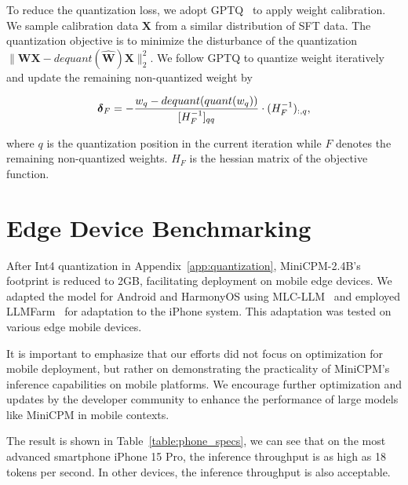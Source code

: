 \documentclass[dvipsnames]{article}
\begin{document}
To reduce the quantization loss, we adopt GPTQ~\citep{DBLP:journals/corr/abs-2210-17323} to apply weight calibration.
We sample calibration data $\mathbf{X}$ from a similar distribution of SFT data. 
The quantization objective is to minimize the disturbance of the quantization $\|\mathbf{W}\mathbf{X}-dequant(\mathbf{\hat W})\mathbf{X}\|_2^2$.
We follow GPTQ to quantize weight iteratively and update the remaining non-quantized weight by

$$
\boldsymbol{\delta}_F = - {w_q-dequant(quant(w_q)) \over [H^{-1}_F]_{qq}} \cdot (H_F^{-1})_{:,q},
$$

where $q$ is the quantization position in the current iteration while $F$ denotes the remaining non-quantized weights. $H_F$ is the hessian matrix of the objective function.

\section{Edge Device Benchmarking}

After Int4 quantization in Appendix~\ref{app:quantization}, MiniCPM-2.4B's footprint is reduced to 2GB, facilitating deployment on mobile edge devices. We adapted the model for Android and HarmonyOS using MLC-LLM~\citep{mlc-llm} and employed LLMFarm~\citep{llmfarm} for adaptation to the iPhone system. This adaptation was tested on various edge mobile devices.

It is important to emphasize that our efforts did not focus on optimization for mobile deployment, but rather on demonstrating the practicality of MiniCPM's inference capabilities on mobile platforms. We encourage further optimization and updates by the developer community to enhance the performance of large models like MiniCPM in mobile contexts. 

The result is shown in Table~\ref{table:phone_specs}, we can see that on the most advanced smartphone iPhone 15 Pro, the inference throughput is as high as 18 tokens per second. In other devices, the inference throughput is also acceptable. 
\end{document}
